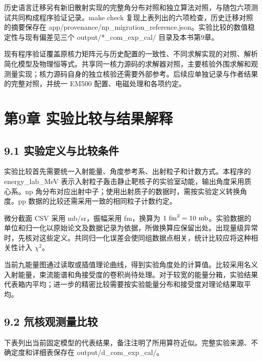 \documentclass[UTF8,a4paper,zihao=5,fontset=fandol]{ctexart}
\begin{document}
历史语言迁移另有新旧散射实现的完整角分布对照和独立算法对照，与随包六项测试共同构成程序验证记录。{\ttfamily\small make check} 复现上表列出的六项检查，历史迁移对照的摘要保存在 {\ttfamily\small app/\allowbreak{}provenance/\allowbreak{}np\_\allowbreak{}migration\_\allowbreak{}reference.\allowbreak{}json}。实验比较的数值稳定性与现有偏差见三个 {\ttfamily\small output/\allowbreak{}*\_\allowbreak{}com\_\allowbreak{}exp\_\allowbreak{}cal/\allowbreak{}} 目录及本书第9章。

现有程序验证覆盖原核力矩阵元与历史配置的一致性、不同求解实现的对照、解析简化模型及物理恒等式。共享同一核力源码的求解器对照，主要核验外围求解和观测量实现；核力源码自身的独立核验还需要外部参考。后续应单独记录与作者结果的完整对照，并统一 EM500 配置、电磁处理和各项约定。

\clearpage\section*{第9章 实验比较与结果解释}
\subsection*{9.1 实验定义与比较条件}
实验比较首先需要统一入射能量、角度参考系、出射粒子和计数方式。本程序的 {\ttfamily\small energy\_\allowbreak{}lab\_\allowbreak{}MeV} 表示入射粒子轰击静止靶核子的实验室动能，输出角度采用质心系。np 角分布对应出射中子；使用出射质子的数据时，需按实验定义转换角度。pp 数据的比较还需采用一致的相同粒子计数约定。

微分截面 CSV 采用 mb/sr，振幅采用 fm，换算为 \(1\ {\rm fm}^2=10\ {\rm mb}\)。实验数据的单位和归一化以原始论文及数据记录为依据，所做换算应保留出处。出现量级异常时，先核对这些定义。共同归一化误差会使同组数据点相关，统计比较应将这种相关性计入 \(\chi^2\)。

当前九能量图通过读取或插值理论曲线，得到实验角度处的计算值。比较采用名义入射能量，束流能谱和角接受度的卷积尚待处理。对于较宽的能量分箱，实验结果代表箱内平均；进一步的精密比较需要按实验能量分布和接受度对理论结果取平均。

\subsection*{9.2 氘核观测量比较}
下表列出当前固定模型的代表结果，备注注明了所用算符近似。完整实验来源、不确定度和详细表保存在 {\ttfamily\small output/\allowbreak{}d\_\allowbreak{}com\_\allowbreak{}exp\_\allowbreak{}cal/\allowbreak{}}。
\end{document}
